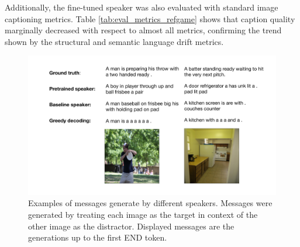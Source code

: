 Additionally, the fine-tuned speaker was also evaluated with standard image captioning metrics. Table \ref{tab:eval_metrics_refgame} shows that caption quality marginally decreased with respect to almost all metrics, confirming the trend shown by the structural and semantic language drift metrics. 

\begin{figure}[h]
	\centering
	\includegraphics[width=\linewidth]{images/example_generations/coco_speakers_randomPairs_examples.pdf}
	\caption{Examples of messages generate by different speakers. Messages were generated by treating each image as the target in context of the other image as the distractor. Displayed messages are the generations up to the first END token.}
	\label{fig:coco_randPairs_speaker_generations}
\end{figure}

